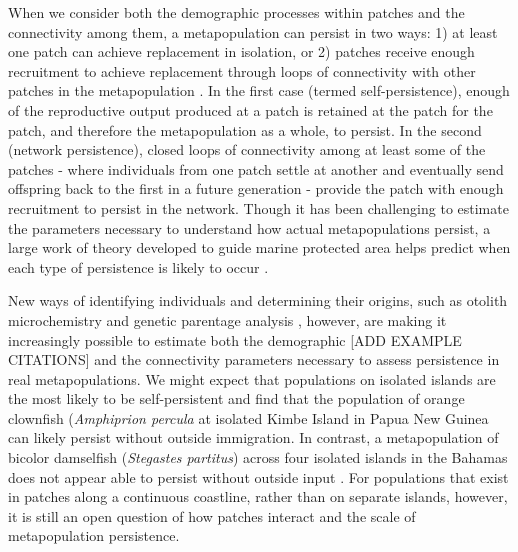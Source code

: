 \documentclass[12pt, oneside]{article}   	%
\begin{document}
When we consider both the demographic processes within patches and the connectivity among them, a metapopulation can persist in two ways: 1) at least one patch can achieve replacement in isolation, or 2) patches receive enough recruitment to achieve replacement through loops of connectivity with other patches in the metapopulation \citep{hastings_persistence_2006, burgess2014beyond}. In the first case (termed self-persistence), enough of the reproductive output produced at a patch is retained at the patch for the patch, and therefore the metapopulation as a whole, to persist. In the second (network persistence), closed loops of connectivity among at least some of the patches - where individuals from one patch settle at another and eventually send offspring back to the first in a future generation - provide the patch with enough recruitment to persist in the network. Though it has been challenging to estimate the parameters necessary to understand how actual metapopulations persist, a large work of theory developed to guide marine protected area helps predict when each type of persistence is likely to occur \citep[i.e.\ large patches relative to the mean dispersal distance are likely to be self-persistent][]{botsford_dependence_2001}. %

New ways of identifying individuals and determining their origins, such as otolith microchemistry and genetic parentage analysis \citep[e.g.][]{wang2004sibship, wang2014estimation}, however, are making it increasingly possible to estimate both the demographic [ADD EXAMPLE CITATIONS] and the connectivity \citep[e.g.][]{hameed2016inverse, almany2017larval} parameters necessary to assess persistence in real metapopulations. We might expect that populations on isolated islands are the most likely to be self-persistent and \cite{salles_coral_2015} find that the population of orange clownfish (\textit{Amphiprion percula} at isolated Kimbe Island in Papua New Guinea can likely persist without outside immigration. In contrast, a metapopulation of bicolor damselfish (\textit{Stegastes partitus}) across four isolated islands in the Bahamas does not appear able to persist without outside input \citep{johnson2018integrating}. For populations that exist in patches along a continuous coastline, rather than on separate islands, however, it is still an open question of how patches interact and the scale of metapopulation persistence.
\end{document}
